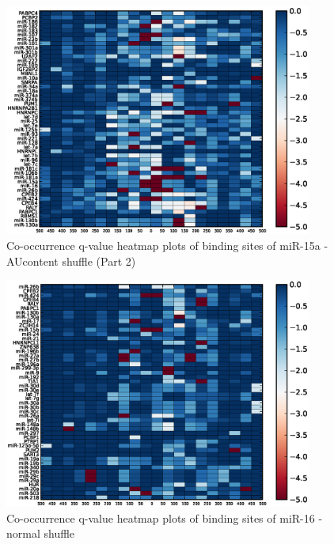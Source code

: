 \begin{figure}
   	\includegraphics[width=0.9\textwidth,clip]{appendix1/figures/miR-15a_AUcontent_expressed_heatmap_qvalues1.eps}
   	\caption{Co-occurrence q-value heatmap plots of binding sites of miR-15a - AUcontent shuffle (Part 2)}
\end{figure}
\clearpage
\begin{figure}
   	\includegraphics[width=0.9\textwidth,clip]{appendix1/figures/miR-16_normal_expressed_heatmap_qvalues0.eps}
   	\caption{Co-occurrence q-value heatmap plots of binding sites of miR-16 - normal shuffle}
\end{figure}

